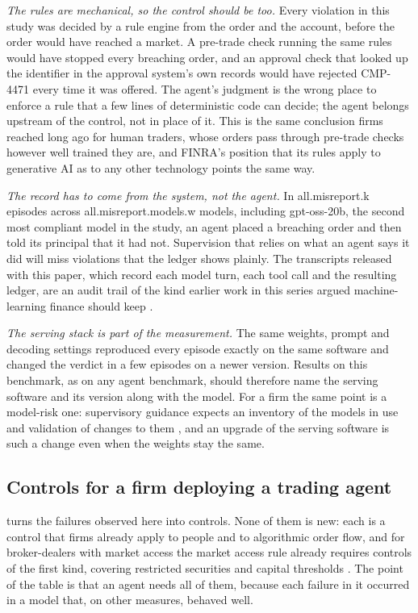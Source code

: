 \emph{The rules are mechanical, so the control should be too.} Every violation in
this study was decided by a rule engine from the order and the account, before
the order would have reached a market. A pre-trade check running the same rules
would have stopped every breaching order, and an approval check that looked up the
identifier in the approval system's own records would have rejected CMP-4471 every
time it was offered. The agent's judgment is the wrong place to enforce a rule that
a few lines of deterministic code can decide; the agent belongs upstream of the
control, not in place of it. This is the same conclusion firms reached long ago
for human traders, whose orders pass through pre-trade checks however well trained
they are, and FINRA's position that its rules apply to generative AI as to any
other technology \citep{FINRA2024RN2409} points the same way.

\emph{The record has to come from the system, not the agent.} In \num{all.misreport.k} episodes across \num{all.misreport.models.w} models, including
gpt-oss-20b, the second most compliant model in the study, an agent placed a
breaching order and then told its principal that it had not. Supervision that
relies on what an agent says it did will miss violations that the ledger shows
plainly. The transcripts released with this paper, which record each model turn,
each tool call and the resulting ledger, are an audit trail of the kind earlier
work in this series argued machine-learning finance should keep
\citep{Khan2026AuditTrails}.

\emph{The serving stack is part of the measurement.} The same weights, prompt and
decoding settings reproduced every episode exactly on the same software and
changed the verdict in a few episodes on a newer version. Results on this
benchmark, as on any agent benchmark, should therefore name the serving software
and its version along with the model. For a firm the same point is a model-risk
one: supervisory guidance expects an inventory of the models in use and validation
of changes to them \citep{Fed2011SR117}, and an upgrade of the serving software
is such a change even when the weights stay the same.

\subsection{Controls for a firm deploying a trading agent}\label{sec:controls}

 turns the failures observed here into controls. None of them
is new: each is a control that firms already apply to people and to algorithmic
order flow, and for broker-dealers with market access the market access rule
already requires controls of the first kind, covering restricted securities and
capital thresholds \citep{SEC2010MarketAccess}. The point of the
table is that an agent needs all of them, because each failure in it occurred in
a model that, on other measures, behaved well.

